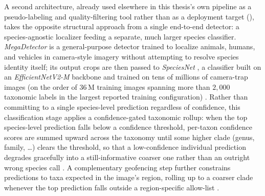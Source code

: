 A second architecture, already used elsewhere in this thesis's own pipeline as a pseudo-labeling and quality-filtering tool rather than as a deployment target (), takes the opposite structural approach from a single end-to-end detector: a species-agnostic localizer feeding a separate, much larger species classifier. \textit{MegaDetector} \cite{beery_megadetector_2019} is a general-purpose detector trained to localize animals, humans, and vehicles in camera-style imagery without attempting to resolve species identity itself; its output crops are then passed to \textit{SpeciesNet} \cite{gadot_speciesnet_2024}, a classifier built on an \textit{EfficientNetV2-M} backbone and trained on tens of millions of camera-trap images (on the order of $36\,\mathrm{M}$ training images spanning more than $2{,}000$ taxonomic labels in the largest reported training configuration) \cite{gadotCropNotCrop2024}. Rather than committing to a single species-level prediction regardless of confidence, this classification stage applies a confidence-gated taxonomic rollup: when the top species-level prediction falls below a confidence threshold, per-taxon confidence scores are summed upward across the taxonomy until some higher clade (genus, family, \ldots) clears the threshold, so that a low-confidence individual prediction degrades gracefully into a still-informative coarser one rather than an outright wrong species call \cite{gadotCropNotCrop2024}. A complementary geofencing step further constrains predictions to taxa expected in the image's region, rolling up to a coarser clade whenever the top prediction falls outside a region-specific allow-list \cite{gadotCropNotCrop2024}.

